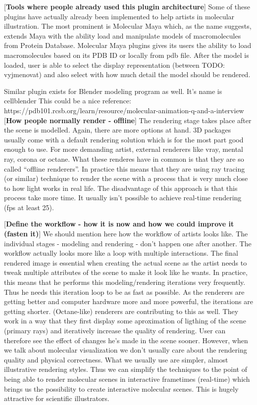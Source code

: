 \documentclass[
  digital, %
  table,   %
  nolof,     %
  nolot,     %
]{fithesis3}
\begin{document}
[\textbf{Tools where people already used this plugin architecture}]
Some of these plugins have actually already been implemented to help artists in molecular illustration. The most prominent is Molecular Maya which, as the name suggests, extends Maya with the ability load and manipulate models of macromolecules from Protein Database. Molecular Maya plugins gives its users the ability to load macromolecules based on its PDB ID or locally from pdb file. After the model is loaded, user is able to select the display representation (between TODO: vyjmenovat) and also select with how much detail the model should be rendered.

Similar plugin exists for Blender modeling program as well. It's name is cellblender
This could be a nice reference: https://pdb101.rcsb.org/learn/resource/molecular-animation-q-and-a-interview
[\textbf{How people normally render - offline}]
The rendering stage takes place after the scene is modelled. Again, there are more options at hand. 3D packages usually come with a default rendering solution which is for the most part good enough to use. For more demanding artist, external renderers like vray, mental ray, corona or octane. What these renderes have in common is that they are so called ``offline renderers''. In practice this means that they are using ray tracing (or similar) technique to render the scene with a process that is very much close to how light works in real life. The disadvantage of this approach is that this process take more time. It usually isn't possible to achieve real-time rendering (fps at least 25).

[\textbf{Define the workflow - how it is now and how we could improve it (fasten it)}]
We should mention here how the workflow of artists looks like. The individual stages - modeling and rendering - don't happen one after another. The workflow actually looks more like a loop with multiple interactions. The final rendered image is essential when creating the actual scene as the artist needs to tweak multiple attributes of the scene to make it look like he wants. In practice, this means that he performs this modeling/rendering iterations very frequently. Thus he needs this iteration loop to be as fast as possible. As the renderers are getting better and computer hardware more and more powerful, the iterations are getting shorter. (Octane-like) renderers are contributing to this as well. They work in a way that they first display some aproximation of ligthing of the scene (primary rays) and iteratively increase the quality of rendering. User can therefore see the effect of changes he's made in the scene sooner. However, when we talk about molecular visualization we don't usually care about the rendering quality and physical correctness. What we usually use are simpler, almost illustrative rendering styles. Thus we can simplify the techniques to the point of being able to render molecular scenes in interactive frametimes (real-time) which brings us the possibility to create interactive molecular scenes. This is hugely attractive for scientific illustrators.
\end{document}

